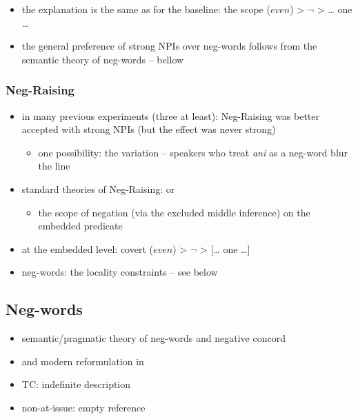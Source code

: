 \documentclass[
  letterpaper,
  DIV=11,
  numbers=noendperiod]{scrartcl}
\providecommand{\tightlist}{%
  \setlength{\itemsep}{0pt}\setlength{\parskip}{0pt}}\usepackage{longtable,booktabs,array}
\begin{document}
\begin{itemize}
\tightlist
\item
  the explanation is the same as for the baseline: the scope (\(even\))
  \textgreater{} \(\neg\) \textgreater{} \ldots{} one \ldots{}
\item
  the general preference of strong NPIs over neg-words follows from the
  semantic theory of neg-words -- bellow
\end{itemize}

\hypertarget{neg-raising}{%
\subsubsection{Neg-Raising}\label{neg-raising}}

\begin{itemize}
\tightlist
\item
  in many previous experiments (three at least): Neg-Raising was better
  accepted with strong NPIs (but the effect was never strong)

  \begin{itemize}
  \tightlist
  \item
    one possibility: the variation -- speakers who treat \emph{ani} as a
    neg-word blur the line
  \end{itemize}
\item
  standard theories of Neg-Raising: \cite{gajewski2007neg} or
  \cite{romoli2013scalar}

  \begin{itemize}
  \tightlist
  \item
    the scope of negation (via the excluded middle inference) on the
    embedded predicate
  \end{itemize}
\item
  at the embedded level: covert (\(even\)) \textgreater{} \(\neg\)
  \textgreater{} {[}\ldots{} one \ldots{]}
\item
  neg-words: the locality constraints -- see below
\end{itemize}

\hypertarget{neg-words}{%
\subsection{Neg-words}\label{neg-words}}

\begin{itemize}
\tightlist
\item
  semantic/pragmatic theory of neg-words and negative concord
\item
  \textcite{ovalle2004double} and modern reformulation in
  \textcite{kuhn2022dynamics}
\item
  TC: indefinite description
\item
  non-at-issue: empty reference
\end{itemize}
\end{document}
